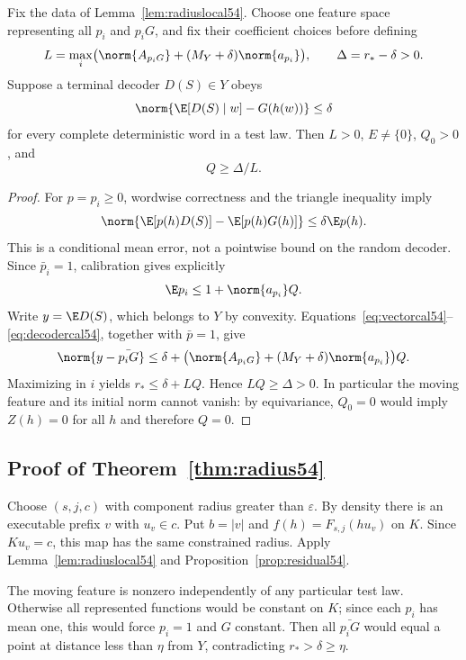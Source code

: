 \begin{proposition}\label{prop:residual54}
Fix the data of Lemma~\ref{lem:radiuslocal54}. Choose one feature space representing all $p_i$ and $p_iG$, and fix their coefficient choices before defining
\[
 L=\max_i\bigl(\norm{A_{p_iG}}+(M_Y+\delta)\norm{a_{p_i}}\bigr),
 \qquad \Delta=r_*-\delta>0.
\]
Suppose a terminal decoder $D(S)\in Y$ obeys
\[
 \norm{\E[D(S)\mid w]-G(h(w))}\le\delta
\]
for every complete deterministic word in a test law. Then $L>0$, $E\ne\{0\}$, $Q_0>0$, and
\begin{equation}\label{eq:residual54}
                         Q\ge\Delta/L.
\end{equation}
\end{proposition}
\begin{proof}
For $p=p_i\ge0$, wordwise correctness and the triangle inequality imply
\[
 \norm{\E[p(h)D(S)]-\E[p(h)G(h)]}\le\delta\E p(h).
\]
This is a conditional mean error, not a pointwise bound on the random decoder. Since $\bar p_i=1$, calibration gives explicitly
\[
                  \E p_i\le1+\norm{a_{p_i}}Q.
\]
Write $y=\E D(S)$, which belongs to $Y$ by convexity. Equations~\eqref{eq:vectorcal54}--\eqref{eq:decodercal54}, together with $\bar p=1$, give
\[
 \norm{y-\bar{p_iG}}\le\delta+
 \bigl(\norm{A_{p_iG}}+(M_Y+\delta)\norm{a_{p_i}}\bigr)Q.
\]
Maximizing in $i$ yields $r_*\le\delta+LQ$. Hence $LQ\ge\Delta>0$. In particular the moving feature and its initial norm cannot vanish: by equivariance, $Q_0=0$ would imply $Z(h)=0$ for all $h$ and therefore $Q=0$.
\end{proof}

\subsection{Proof of Theorem~\ref{thm:radius54}}
Choose $(s,j,c)$ with component radius greater than $\varepsilon$. By density there is an executable prefix $v$ with $u_v\in c$. Put $b=|v|$ and $f(h)=F_{s,j}(hu_v)$ on $K$. Since $Ku_v=c$, this map has the same constrained radius. Apply Lemma~\ref{lem:radiuslocal54} and Proposition~\ref{prop:residual54}.

The moving feature is nonzero independently of any particular test law. Otherwise all represented functions would be constant on $K$; since each $p_i$ has mean one, this would force $p_i=1$ and $G$ constant. Then all $\bar{p_iG}$ would equal a point at distance less than $\eta$ from $Y$, contradicting $r_*>\delta\ge\eta$.

